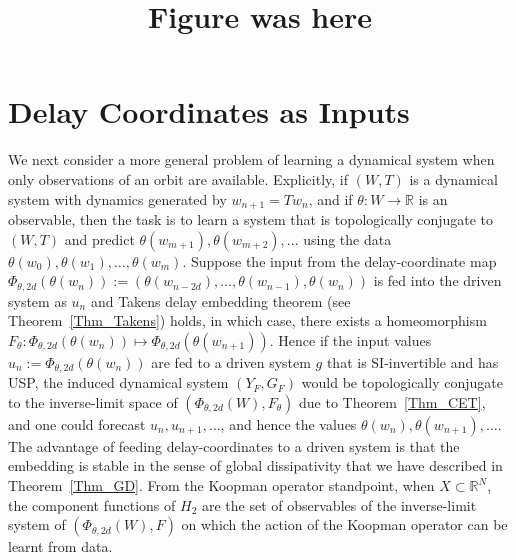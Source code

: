 \documentclass[12 pt]{article}
\begin{document}
\title{Figure was here}

\section{Delay Coordinates as Inputs} \label{Sec_DC}

We next consider a more general problem of learning a dynamical system when only observations of an orbit are available. Explicitly, if $(W,T)$ is a dynamical system with dynamics generated by $w_{n+1}=Tw_n$, and if $\theta:W \to \mathbb{R}$ is an observable, then the task is to learn a system that is topologically conjugate to $(W,T)$ and predict $\theta(w_{m+1}),\theta(w_{m+2}),...$ using the data $\theta(w_{0}),\theta(w_{1}),\ldots,\theta(w_{m})$.  
Suppose the input from the delay-coordinate map $\Phi_{\theta,2d}(\theta(w_{n})) := (\theta(w_{n-2d}),\ldots,\theta(w_{n-1}),\theta(w_{n}))$ is fed into the driven system as $u_n$ and Takens delay embedding theorem (see Theorem~\ref{Thm_Takens}) holds, in which case, there exists a homeomorphism  $F_\theta: \Phi_{\theta,2d}(\theta(w_{n})) \mapsto \Phi_{\theta,2d}(\theta(w_{n+1}))$. Hence if the input values $u_n := \Phi_{\theta,2d}(\theta(w_{n}))$ are fed to a driven system $g$ that is SI-invertible and has USP, the induced dynamical system $(Y_F,G_F)$ would be topologically conjugate to the inverse-limit space of
$(\Phi_{\theta,2d}(W), F_\theta)$ due to Theorem~\ref{Thm_CET}, and one could forecast $u_n,u_{n+1},\ldots$, and hence the values $\theta(w_n), \theta(w_{n+1}),\ldots$. The advantage of feeding delay-coordinates to a driven system is that the embedding is stable in the sense of global dissipativity that we have described in Theorem~\ref{Thm_GD}. From the Koopman operator standpoint, when $X \subset \mathbb{R}^N$, the component functions of $H_2$ are the set of observables 
of the inverse-limit system of $(\Phi_{\theta,2d}(W), F)$ on which the action of the Koopman operator can be learnt from data. 
\end{document}
